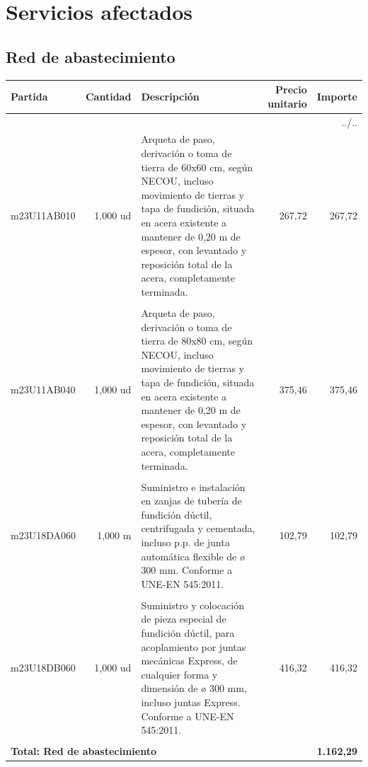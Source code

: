 \documentclass{book}%
\begin{document}
%
\section{Servicios afectados}%
\subsection{Red de abastecimiento}%
\small%
\begin{longtable}{lrlrr}%
Partida&Cantidad&Descripción&\multicolumn{1}{p{1.5cm}}{Precio unitario}&Importe\\%
\hline%
\endhead%
\multicolumn{5}{r}{../..}\\%
\endfoot%
\hline%
\endlastfoot%
m23U11AB010&     1,000 ud&\multicolumn{1}{p{5cm}}{Arqueta de paso, derivación o toma de tierra de 60x60 cm, según NECOU, incluso movimiento de tierras y tapa de fundición, situada en acera existente a mantener de 0,20 m de espesor, con levantado y reposición total de la acera, completamente terminada.}&    267,72&267,72\\%
&&&&\\%
m23U11AB040&     1,000 ud&\multicolumn{1}{p{5cm}}{Arqueta de paso, derivación o toma de tierra de 80x80 cm, según NECOU, incluso movimiento de tierras y tapa de fundición, situada en acera existente a mantener de 0,20 m de espesor, con levantado y reposición total de la acera, completamente terminada.}&    375,46&375,46\\%
&&&&\\%
m23U18DA060&     1,000 m&\multicolumn{1}{p{5cm}}{Suministro e instalación en zanjas de tubería de fundición dúctil, centrifugada y cementada, incluso p.p. de junta automática flexible de ø 300 mm. Conforme a UNE{-}EN 545:2011.}&    102,79&102,79\\%
&&&&\\%
m23U18DB060&     1,000 ud&\multicolumn{1}{p{5cm}}{Suministro y colocación de pieza especial de fundición dúctil, para acoplamiento por juntas mecánicas Express, de cualquier forma y dimensión de ø 300 mm, incluso juntas Express. Conforme a UNE{-}EN 545:2011.}&    416,32&416,32\\%
&&&&\\%
\multicolumn{4}{p{8cm}}{\textbf{Total: Red de abastecimiento}}&\textbf{1.162,29}\\%
\end{longtable}%
\normalsize

%
\end{document}
